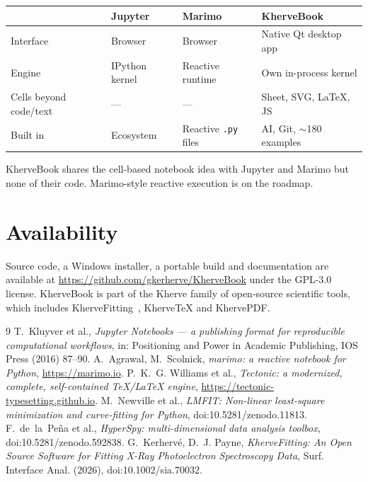 \documentclass[11pt,a4paper]{article}
\begin{document}
\begin{center}
\begin{tabular}{@{}llll@{}}
\toprule
 & Jupyter & Marimo & KherveBook \\
\midrule
Interface & Browser & Browser & Native Qt desktop app \\
Engine & IPython kernel & Reactive runtime & Own in-process kernel \\
Cells beyond code/text & --- & --- & Sheet, SVG, LaTeX, JS \\
Built in & Ecosystem & Reactive \texttt{.py} files & AI, Git, $\sim$180 examples \\
\bottomrule
\end{tabular}
\end{center}

KherveBook shares the cell-based notebook idea with Jupyter and Marimo but none of their code. Marimo-style reactive execution is on the roadmap.

\section{Availability}

Source code, a Windows installer, a portable build and documentation are available at \url{https://github.com/gkerherve/KherveBook} under the GPL-3.0 license. KherveBook is part of the Kherve family of open-source scientific tools, which includes KherveFitting~\cite{khervefitting}, KherveTeX and KhervePDF.

\begin{thebibliography}{9}
 T.~Kluyver et al., \emph{Jupyter Notebooks --- a publishing format for reproducible computational workflows}, in: Positioning and Power in Academic Publishing, IOS Press (2016) 87--90.
 A.~Agrawal, M.~Scolnick, \emph{marimo: a reactive notebook for Python}, \url{https://marimo.io}.
 P.~K.~G. Williams et al., \emph{Tectonic: a modernized, complete, self-contained TeX/LaTeX engine}, \url{https://tectonic-typesetting.github.io}.
 M.~Newville et al., \emph{LMFIT: Non-linear least-square minimization and curve-fitting for Python}, doi:10.5281/zenodo.11813.
 F.~de~la~Peña et al., \emph{HyperSpy: multi-dimensional data analysis toolbox}, doi:10.5281/zenodo.592838.
 G.~Kerhervé, D.~J. Payne, \emph{KherveFitting: An Open Source Software for Fitting X-Ray Photoelectron Spectroscopy Data}, Surf. Interface Anal. (2026), doi:10.1002/sia.70032.
\end{thebibliography}
\end{document}
